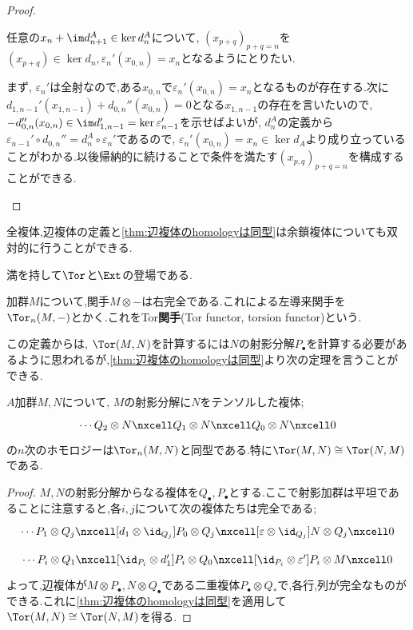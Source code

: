 \begin{proof}
\begin{step}
		任意の$x_n+\im d_{n+1}^A\in\ker d_n^A$について, $(x_{p+q})_{p+q=n}$を$(x_{p+q})\in\ker d_n,\varepsilon_n'(x_{0,n})=x_n$となるようにとりたい.
		
		まず, $\varepsilon_n'$は全射なので,ある$x_{0,n}$で$\varepsilon_n'(x_{0,n})=x_n$となるものが存在する.次に$d_{1,n-1}'(x_{1,n-1})+d_{0,n}''(x_{0,n})=0$となる$x_{1,n-1}$の存在を言いたいので, $-d_{0,n}''(x_{0,n})\in\im d_{1,n-1}'=\ker\varepsilon_{n-1}'$を示せばよいが, $d_n^A$の定義から$\varepsilon_{n-1}'\circ d_{0,n}''=d_n^A\circ\varepsilon_n'$であるので, $\varepsilon_n'(x_{0,n})=x_n\in\ker d_A$より成り立っていることがわかる.以後帰納的に続けることで条件を満たす$(x_{p,q})_{p+q=n}$を構成することができる.
		
	\end{step}
\end{proof}

全複体,辺複体の定義と\ref{thm:辺複体のhomologyは同型}は余鎖複体についても双対的に行うことができる.

満を持して$\Tor$と$\Ext$の登場である.
\begin{defi}[$\Tor$]
	加群$M$について,関手$M\otimes -$は右完全である.これによる左導来関手を$\Tor_n(M,-)$とかく.これをTor\textbf{関手}(Tor functor, torsion functor)という. 
\end{defi}

この定義からは, $\Tor(M,N)$を計算するには$N$の射影分解$P_\bullet$を計算する必要があるように思われるが,\ref{thm:辺複体のhomologyは同型}より次の定理を言うことができる.

\begin{thm}
	$A$加群$M,N$について, $M$の射影分解に$N$をテンソルした複体;
	\[\begin{tikzcd}
		\cdots Q_2\otimes N\nxcell Q_1\otimes N\nxcell Q_0\otimes N\nxcell0
	\end{tikzcd}\]
	の$n$次のホモロジーは$\Tor_n(M,N)$と同型である.特に$\Tor(M,N)\cong\Tor(N,M)$である.
\end{thm}

\begin{proof}
	$M,N$の射影分解からなる複体を$Q_\bullet,P_\bullet$とする.ここで射影加群は平坦であることに注意すると,各$i,j$について次の複体たちは完全である;
	\[\begin{tikzcd}
		\cdots P_1\otimes Q_j\nxcell[d_1\otimes\id_{Q_j}] P_0\otimes Q_j\nxcell[\varepsilon\otimes\id_{Q_j}]N\otimes Q_j\nxcell0
	\end{tikzcd}\]
	\[\begin{tikzcd}
		\cdots P_i\otimes Q_1\nxcell[\id_{P_i}\otimes d_1'] P_i\otimes Q_0\nxcell[\id_{P_i}\otimes\varepsilon']P_i\otimes M\nxcell0
	\end{tikzcd}\]
	よって,辺複体が$M\otimes P_\bullet,N\otimes Q_\bullet$である二重複体$P_\bullet\otimes Q_\ast$で,各行,列が完全なものができる.これに\ref{thm:辺複体のhomologyは同型}を適用して$\Tor(M,N)\cong\Tor(N,M)$を得る.
\end{proof}

